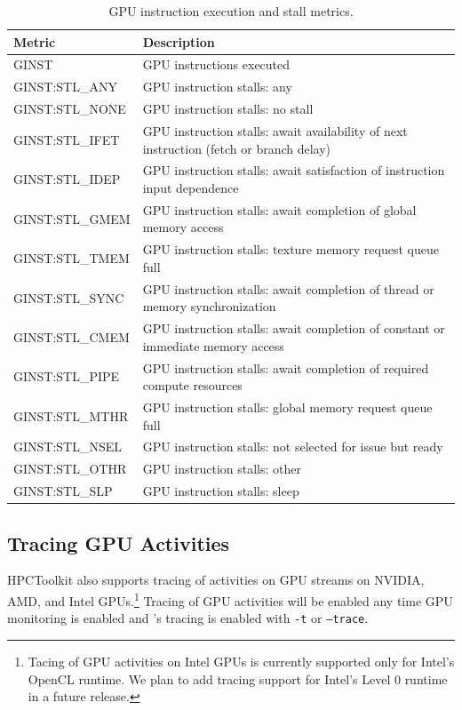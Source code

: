 \begin{table}[t]
\centering
\begin{tabular}{|l|p{3.5in}|}\hline
Metric & Description\\\hline\hline
GINST & GPU instructions executed\\\hline
GINST:STL\_ANY  &  GPU instruction stalls: any  \\\hline
 GINST:STL\_NONE  &  GPU instruction stalls: no stall  \\\hline
 GINST:STL\_IFET  &  GPU instruction stalls: await availability of next    instruction (fetch or branch delay)  \\\hline
 GINST:STL\_IDEP  &  GPU instruction stalls: await satisfaction of instruction    input dependence  \\\hline
 GINST:STL\_GMEM  &  GPU instruction stalls: await completion of global memory    access  \\\hline
 GINST:STL\_TMEM  &  GPU instruction stalls: texture memory request queue full  \\\hline
 GINST:STL\_SYNC  &  GPU instruction stalls: await completion of thread or    memory synchronization  \\\hline
 GINST:STL\_CMEM  &  GPU instruction stalls: await completion of constant or    immediate memory access  \\\hline
 GINST:STL\_PIPE  &  GPU instruction stalls: await completion of required    compute resources  \\\hline
 GINST:STL\_MTHR  &  GPU instruction stalls: global memory request queue full  \\\hline
 GINST:STL\_NSEL  &  GPU instruction stalls: not selected for issue but ready  \\\hline
 GINST:STL\_OTHR  &  GPU instruction stalls: other  \\\hline
 GINST:STL\_SLP  &  GPU instruction stalls: sleep  \\\hline
\end{tabular}
\caption{GPU instruction execution and stall metrics.}
\label{table:pc-stall}
\end{table}

\subsection{Tracing GPU Activities}
HPCToolkit also supports tracing of activities on GPU streams on NVIDIA, AMD, and Intel GPUs.\footnote{Tacing of GPU activities on Intel GPUs is currently supported only for Intel's OpenCL runtime. We plan to add tracing support for Intel's Level 0 runtime in a future release.}  Tracing of GPU activities will be enabled any time GPU monitoring is enabled and \hpcrun's tracing is enabled with {\tt -t} or {\tt --trace}.

